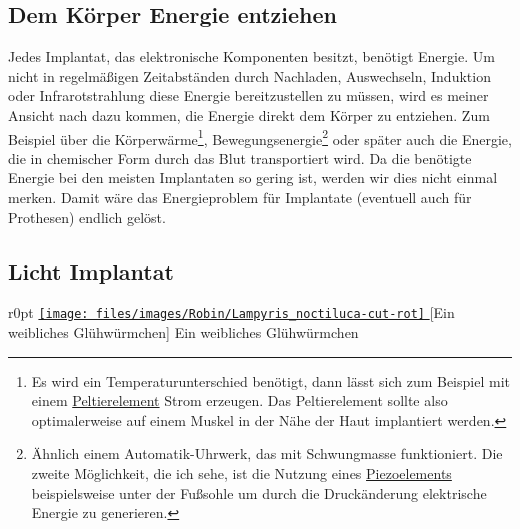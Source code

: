 \subsection{Dem Körper Energie entziehen}
Jedes Implantat, das elektronische Komponenten besitzt, benötigt Energie. Um nicht in regelmäßigen
Zeitabständen durch Nachladen, Auswechseln, Induktion oder Infrarotstrahlung diese Energie
bereitzustellen zu müssen, wird es meiner Ansicht nach dazu kommen, die Energie direkt dem Körper zu
entziehen. Zum Beispiel über die Körperwärme\footnote{Es wird ein Temperaturunterschied benötigt,
dann lässt sich zum Beispiel mit einem
\href{http://de.wikipedia.org/wiki/Peltier-Element}{Peltierelement} Strom erzeugen.
Das Peltierelement sollte also optimalerweise auf einem Muskel in der Nähe der Haut implantiert
werden.},
Bewegungsenergie\footnote{Ähnlich einem Automatik-Uhrwerk, das mit Schwungmasse funktioniert.
Die zweite Möglichkeit, die ich sehe, ist die Nutzung eines
\href{http://de.wikipedia.org/wiki/Piezoelement}{Piezoelements} beispielsweise unter der
Fußsohle um durch die Druckänderung elektrische Energie zu generieren.}%
oder später auch die Energie, die in chemischer Form
durch das Blut
transportiert wird. Da die benötigte Energie bei den meisten Implantaten so gering ist, werden wir
dies nicht einmal merken. Damit wäre das Energieproblem für Implantate (eventuell auch für Prothesen)
endlich gelöst.

\subsection{Licht Implantat}
\begin{wrapfigure}{r}{0pt}
	\href{http://de.wikipedia.org/w/index.php?title=Datei:Lampyris_noctiluca.jpg&filetimestamp=20050618231628}{%
		\texttt{[image: files/images/Robin/Lampyris\_noctiluca-cut-rot]}%
	}
	[Ein weibliches Glühwürmchen]%
		{Ein weibliches Glühwürmchen\footnotemark}%
	\label{fig:Firefly}
\end{wrapfigure}


